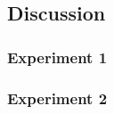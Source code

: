 \documentclass[Main]{subfiles}
\begin{document}
		
		


	\subsection{Discussion} %
		\label{sub:discussion}
		\subsubsection{Experiment 1} %
			\label{ssub:experiment_1}



			
		
		\subsubsection{Experiment 2} %
			\label{ssub:experiment_2}
			



\end{document}
